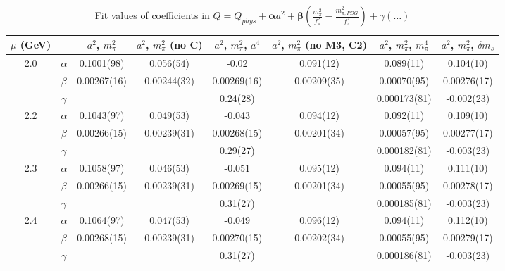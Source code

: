 \documentclass[12pt]{extarticle}
\begin{document}
\begin{table}[h!]
\begin{center}
\begin{tabular}{|c c|c|c|c|c|c|c|}
\hline
$\mu$ (GeV) &  & $a^2$, $m_\pi^2$& $a^2$, $m_\pi^2$ (no C)& $a^2$, $m_\pi^2$, $a^4$& $a^2$, $m_\pi^2$ (no M3, C2)& $a^2$, $m_\pi^2$, $m_\pi^4$& $a^2$, $m_\pi^2$, $\delta m_s$\\
\hline
\multirow{3}{0.5in}{2.0} & $\alpha$ & 0.1001(98)& 0.056(54)& -0.02& 0.091(12)& 0.089(11)& 0.104(10)\\
 & $\beta$ & 0.00267(16)& 0.00244(32)& 0.00269(16)& 0.00209(35)& 0.00070(95)& 0.00276(17)\\
 & $\gamma$ &  &  & 0.24(28)&  & 0.000173(81)& -0.002(23)\\
\hline
\multirow{3}{0.5in}{2.2} & $\alpha$ & 0.1043(97)& 0.049(53)& -0.043& 0.094(12)& 0.092(11)& 0.109(10)\\
 & $\beta$ & 0.00266(15)& 0.00239(31)& 0.00268(15)& 0.00201(34)& 0.00057(95)& 0.00277(17)\\
 & $\gamma$ &  &  & 0.29(27)&  & 0.000182(81)& -0.003(23)\\
\hline
\multirow{3}{0.5in}{2.3} & $\alpha$ & 0.1058(97)& 0.046(53)& -0.051& 0.095(12)& 0.094(11)& 0.111(10)\\
 & $\beta$ & 0.00266(15)& 0.00239(31)& 0.00269(15)& 0.00201(34)& 0.00055(95)& 0.00278(17)\\
 & $\gamma$ &  &  & 0.31(27)&  & 0.000185(81)& -0.003(23)\\
\hline
\multirow{3}{0.5in}{2.4} & $\alpha$ & 0.1064(97)& 0.047(53)& -0.049& 0.096(12)& 0.094(11)& 0.112(10)\\
 & $\beta$ & 0.00268(15)& 0.00239(31)& 0.00270(15)& 0.00202(34)& 0.00055(95)& 0.00279(17)\\
 & $\gamma$ &  &  & 0.31(27)&  & 0.000186(81)& -0.003(23)\\
\hline
\end{tabular}
\caption{Fit values of coefficients in $Q = Q_{phys} + \mathbf{\alpha} a^2 + \mathbf{\beta}\left(\frac{m_\pi^2}{f_\pi^2}-\frac{m_{\pi,PDG}^2}{f_\pi^2}\right) + \gamma(\ldots)$}
\end{center}
\end{table}







\end{document}
